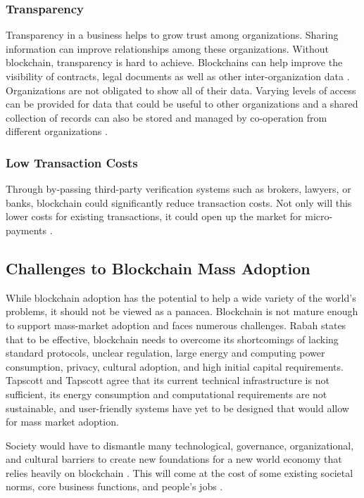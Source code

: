 \documentclass[sigconf]{acmart}
\begin{document}
\subsubsection{Transparency} Transparency in a business helps to grow trust among organizations. Sharing information can improve relationships among these organizations. Without blockchain, transparency is hard to achieve. Blockchains can help improve the visibility of contracts, legal documents as well as other inter-organization data \cite{pabc1}. Organizations are not obligated to show all of their data. Varying levels of access can be provided for data that could be useful to other organizations and a shared collection of records can also be stored and managed by co-operation from different organizations \cite{tapscott}.

\subsubsection{Low Transaction Costs} Through by-passing third-party verification systems such as brokers, lawyers, or banks, blockchain could significantly reduce transaction costs. Not only will this lower costs for existing transactions, it could open up the market for micro-payments \cite{hbr}. 

\subsection{Challenges to Blockchain Mass Adoption}
While blockchain adoption has the potential to help a wide variety of the world's problems, it should not be viewed as a panacea.  Blockchain is not mature enough to support mass-market adoption and faces numerous challenges. Rabah \cite{rabah2017overview} states that to be effective, blockchain needs to overcome its shortcomings of lacking standard protocols, unclear regulation, large energy and computing power consumption, privacy, cultural adoption, and high initial capital requirements. Tapscott and Tapscott \cite{tapscott} agree that its current technical infrastructure is not sufficient, its energy consumption and computational requirements are not sustainable, and user-friendly systems have yet to be designed that would allow for mass market adoption.

Society would have to dismantle many technological, governance, organizational, and cultural barriers to create new foundations for a new world economy that relies heavily on blockchain \cite{hbr}. This will come at the cost of some existing societal norms, core business functions, and people's jobs \cite{hbr} \cite{rabah2017overview}. 
\end{document}
